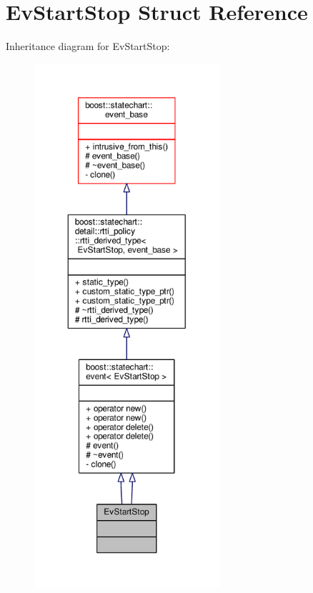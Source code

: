 \hypertarget{struct_ev_start_stop}{}\section{Ev\+Start\+Stop Struct Reference}
\label{struct_ev_start_stop}


Inheritance diagram for Ev\+Start\+Stop\+:
\nopagebreak
\begin{figure}[H]
\begin{center}
\leavevmode
\includegraphics[height=550pt]{struct_ev_start_stop__inherit__graph}
\end{center}
\end{figure}


